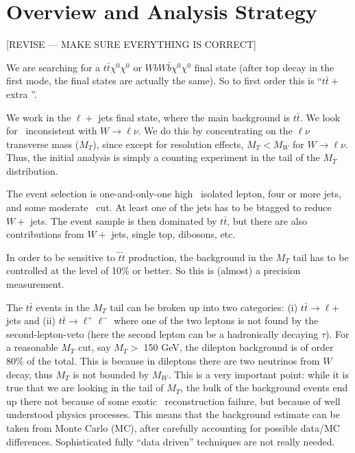 \section{Overview and Analysis Strategy}
\label{sec:overview}

[REVISE --- MAKE SURE EVERYTHING IS CORRECT]

We are searching for a $t\bar{t}\chi^0\chi^0$ or $W b W \bar{b} \chi^0 \chi^0$ final state
(after top decay in the first mode, the final states are actually the same).  So to first order 
this is ``$t\bar{t} +$ extra \met''.  

We work in the $\ell +$ jets final state, where the main background is $t\bar{t}$.  We look for 
\met\ inconsistent with $W \to \ell \nu$.  We do this by concentrating on the $\ell \nu$ transverse
mass ($M_T$), since except for resolution effects, $M_T < M_W$ for $W \to \ell \nu$.  Thus, the
initial analysis is simply a counting experiment in the tail of the $M_T$ distribution.  

The event selection is one-and-only-one high \pt\ isolated lepton, four or more jets, and
some moderate \met\ cut.  At least one of the jets has to be btagged to reduce $W+$ jets.
The event sample is then dominated by $t\bar{t}$, but there are also contributions from $W+$ jets,
single top, dibosons, etc.

In order to be sensitive to $\widetilde{t}\widetilde{t}$ production, the background in the $M_T$
tail has to be controlled at the level of 10\% or better. So this is (almost) a precision measurement.

The $t\bar{t}$ events in the $M_T$ tail can be broken up into two categories: 
(i) $t\bar{t} \to \ell $+ jets and (ii) $t\bar{t} \to \ell^+ \ell^-$ where one of the two
leptons is not found by the second-lepton-veto (here the second lepton can be a hadronically
decaying $\tau$).
 For a reasonable $M_T$ cut, say $M_T >$ 150 GeV, the dilepton background is of order 80\% of 
the total.  This is because in dileptons there are two neutrinos from $W$ decay, thus $M_T$
is not bounded by $M_W$.  This is a very important point: while it is true that we are looking in
the tail of $M_T$, the bulk of the background events end up there not because of some exotic
\met\ reconstruction failure, but because of well understood physics processes.  This means that 
the background estimate can be taken from Monte Carlo (MC), after carefully accounting for possible
data/MC differences.  Sophisticated fully ``data driven'' techniques are not really needed.

